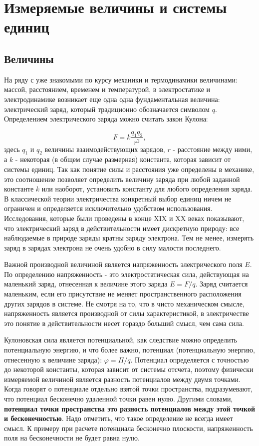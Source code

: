 \section{Измеряемые величины и системы единиц}

\subsection{Величины}

На ряду с уже знакомыми по курсу механики и термодинамики величинами: массой, расстоянием, временем и температурой, в электростатике и электродинамике возникает еще одна одна фундаментальная величина: электрический заряд, который традиционно обозначается символом $q$. Определением электрического заряда можно считать закон Кулона:

\begin{equation}
\label{eq:coulomb}
	F = k \frac{q_1 q_2}{r^2},
\end{equation}
здесь $q_1$ и $q_2$ величины взаимодействующих зарядов, $r$ - расстояние между ними, а $k$ - некоторая (в общем случае размерная) константа, которая зависит от системы единиц. Так как понятие силы и расстояния уже определены в механике, это соотношение позволяет определить величину заряда при любой заданной константе $k$ или наоборот, установить константу для любого определения заряда. В классической теории электричества конкретный выбор единиц ничем не ограничен и определяется исключительно удобством использования. Исследования, которые были проведены в конце XIX и XX веках показывают, что электрический заряд в действительности имеет дискретную природу: все наблюдаемые в природе заряды кратны заряду электрона. Тем не менее, измерять заряд в зарядах электрона не очень удобно в силу малости последнего.

Важной производной величиной является напряженность электрического поля $E$. По определению напряженность - это электростатическая сила, действующая на маленький заряд, отнесенная к величине этого заряда $E = F/q$. Заряд считается маленьким, если его присутствие не меняет пространственного расположения других зарядов в системе. Не смотря на то, что в чисто механическом смысле, напряженность является производной от силы характеристикой, в электричестве это понятие в действительности несет гораздо больший смысл, чем сама сила.

Кулоновская сила является потенциальной, как следствие можно определить потенциальную энергию, и что более важно, потенциал (потенциальную энергию, отнесенную к величине заряда): $\varphi = \Pi/q$. Потенциал определяется с точностью до некоторой константы, которая зависит от системы отсчета, поэтому физически измеряемой величиной является разность потенциалов между двумя точками. Когда говорят о потенциале отдельно взятой точки пространства, подразумевают, что потенциал бесконечно удаленной точки равен нулю. Другими словами, \textbf{потенциал точки пространства это разность потенциалов между этой точкой и бесконечностью}. Надо отметить, что такое определение не всегда имеет смысл. К примеру при расчете потенциала бесконечно плоскости, напряженность поля на бесконечности не будет равна нулю.


